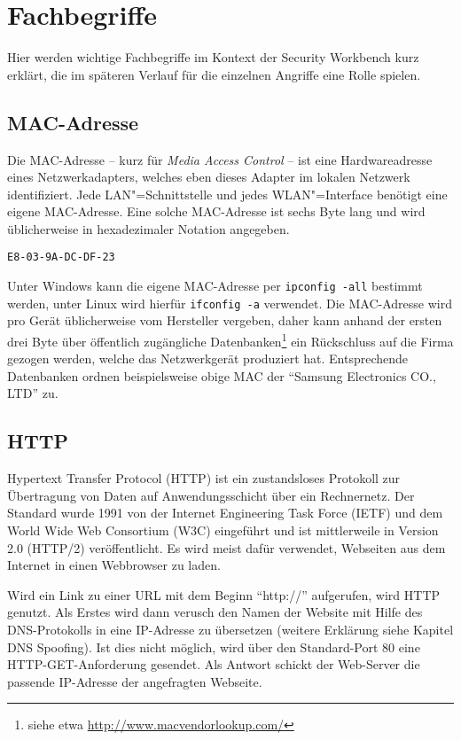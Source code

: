 \chapter{Fachbegriffe}
Hier werden wichtige Fachbegriffe im Kontext der Security Workbench kurz erklärt, die im späteren Verlauf für die einzelnen Angriffe eine Rolle spielen.

\section{MAC-Adresse}

Die MAC-Adresse -- kurz für \emph{Media Access Control} -- ist eine Hardwareadresse eines Netzwerkadapters, welches eben dieses Adapter im lokalen Netzwerk identifiziert. Jede LAN"=Schnittstelle und jedes WLAN"=Interface benötigt eine eigene MAC-Adresse. Eine solche MAC-Adresse ist sechs Byte lang und wird üblicherweise in hexadezimaler Notation angegeben.
\begin{verbatim}
E8-03-9A-DC-DF-23
\end{verbatim}
Unter Windows kann die eigene MAC-Adresse per \verb|ipconfig -all| bestimmt werden, unter Linux wird hierfür \verb|ifconfig -a| verwendet. Die MAC-Adresse wird pro Gerät üblicherweise vom Hersteller vergeben, daher kann anhand der ersten drei Byte über öffentlich zugängliche Datenbanken\footnote{siehe etwa \url{http://www.macvendorlookup.com/}} ein Rückschluss auf die Firma gezogen werden, welche das Netzwerkgerät produziert hat. Entsprechende Datenbanken ordnen beispielsweise obige MAC der \enquote{Samsung Electronics CO., LTD} zu.

\section{HTTP}
Hypertext Transfer Protocol (HTTP) ist ein zustandsloses Protokoll zur Übertragung von Daten auf Anwendungsschicht über ein Rechnernetz. Der Standard wurde 1991 von der Internet Engineering Task Force (IETF) und dem World Wide Web Consortium (W3C) eingeführt und ist mittlerweile in Version 2.0 (HTTP/2) veröffentlicht. Es wird meist dafür verwendet, Webseiten aus dem Internet in einen Webbrowser zu laden.

Wird ein Link zu einer URL mit dem Beginn \enquote{http://} aufgerufen, wird HTTP genutzt. Als Erstes wird dann verusch den Namen der Website mit Hilfe des DNS-Protokolls in eine IP-Adresse zu übersetzen (weitere Erklärung siehe Kapitel DNS Spoofing). Ist dies nicht möglich, wird über den Standard-Port 80 eine HTTP-GET-Anforderung gesendet. Als Antwort schickt der Web-Server die passende IP-Adresse der angefragten Webseite.

